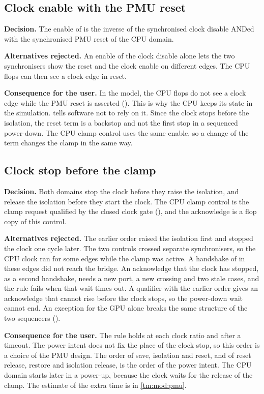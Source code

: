 \subsection{Clock enable with the PMU reset}\label{ds:ch:mod-power-management:dec-clock}
\textbf{Decision.} The enable of  is the inverse of the synchronised clock disable ANDed with the synchronised PMU reset of the CPU domain.

\textbf{Alternatives rejected.} An enable of the clock disable alone lets the two synchronisers show the reset and the clock enable on different edges. The CPU flops can then see a clock edge in reset.

\textbf{Consequence for the user.} In the model, the CPU flops do not see a clock edge while the PMU reset is asserted (). This is why the CPU keeps its state in the simulation.  tells software not to rely on it. Since the clock stops before the isolation, the reset term is a backstop and not the first stop in a sequenced power-down. The CPU clamp control uses the same enable, so a change of the term changes the clamp in the same way.

\subsection{Clock stop before the clamp}\label{ds:ch:mod-power-management:dec-order}
\textbf{Decision.} Both domains stop the clock before they raise the isolation, and release the isolation before they start the clock. The CPU clamp control is the clamp request qualified by the closed clock gate (), and the acknowledge is a flop copy of this control.

\textbf{Alternatives rejected.} The earlier order raised the isolation first and stopped the clock one cycle later. The two controls crossed separate synchronisers, so the CPU clock ran for some edges while the clamp was active. A handshake of  in these edges did not reach the bridge. An acknowledge that the clock has stopped, as a second handshake, needs a new port, a new crossing and two stale cases, and the rule fails when that wait times out. A qualifier with the earlier order gives an acknowledge that cannot rise before the clock stops, so the power-down wait cannot end. An exception for the GPU alone breaks the same structure of the two sequencers ().

\textbf{Consequence for the user.} The rule holds at each clock ratio and after a timeout. The power intent does not fix the place of the clock stop, so this order is a choice of the PMU design. The order of save, isolation and reset, and of reset release, restore and isolation release, is the order of the power intent. The CPU domain starts later in a power-up, because the clock waits for the release of the clamp. The estimate of the extra time is in \cref{tm:mod:pmu}.

